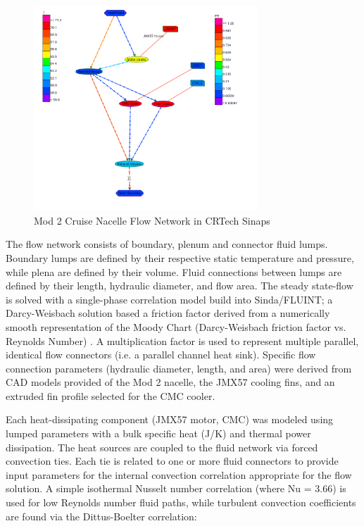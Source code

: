 \documentclass[]{aiaa-tc}%
\begin{document}
\begin{figure}[!htb]%
	\centering
	\includegraphics[width=0.75\textwidth]{figures/sinaps_paramsweep.PNG}
	\caption{Mod 2 Cruise Nacelle Flow Network in CRTech Sinaps}
	\label{fig:Sinaps}
\end{figure}

The flow network consists of boundary, plenum and connector fluid lumps.  Boundary lumps are defined by their respective static temperature and pressure, while plena are defined by their volume.  Fluid connections between lumps are defined by their length, hydraulic diameter, and flow area.  The steady state-flow is solved with a single-phase correlation model build into Sinda/FLUINT; a Darcy-Weisbach solution based a friction factor derived from a numerically smooth representation of the Moody Chart  (Darcy-Weisbach friction factor vs. Reynolds Number) \cite{CRtech_2013}.  A multiplication factor is used to represent multiple parallel, identical flow connectors (i.e. a parallel channel heat sink).  Specific flow connection parameters (hydraulic diameter, length, and area) were derived from CAD models provided of the Mod 2 nacelle, the JMX57 cooling fins, and an extruded fin profile selected for the CMC cooler.  

Each heat-dissipating component (JMX57 motor, CMC) was modeled using lumped parameters with a bulk specific heat (J/K) and thermal power dissipation.  The heat sources are coupled to the fluid network via forced convection ties.  Each tie is related to one or more fluid connectors to provide input parameters for the internal convection correlation appropriate for the flow solution.  A simple isothermal Nusselt number correlation (where Nu = 3.66) is used for low Reynolds number fluid paths, while turbulent convection coefficients are found via the Dittus-Boelter correlation\cite{CRtech_2015}:  
\end{document}
